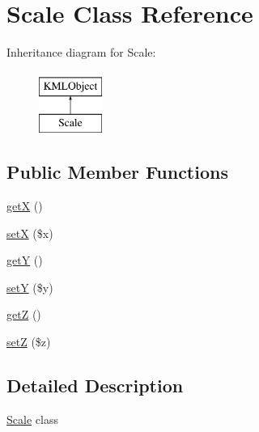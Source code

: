 \hypertarget{classScale}{
\section{Scale Class Reference}
\label{dd/d9a/classScale}
}
Inheritance diagram for Scale:\begin{figure}[H]
\begin{center}
\leavevmode
\includegraphics[height=2.000000cm]{dd/d9a/classScale}
\end{center}
\end{figure}
\subsection*{Public Member Functions}
\begin{DoxyCompactItemize}
\item 
\hyperlink{classScale_ad9463271df7904a553d87c057d715a2b}{getX} ()
\item 
\hyperlink{classScale_a2df161b4605576c9728685b31b94fc39}{setX} (\$x)
\item 
\hyperlink{classScale_a067e898a2439dd1ac838b99d76dc8820}{getY} ()
\item 
\hyperlink{classScale_a370b79874cccd764b351dee7c4fdb8d1}{setY} (\$y)
\item 
\hyperlink{classScale_a04c3de32fe999c61a49e6bf8ad62235f}{getZ} ()
\item 
\hyperlink{classScale_aeba7ec21e7c0d16090ec26f7a47d2c87}{setZ} (\$z)
\end{DoxyCompactItemize}


\subsection{Detailed Description}
\hyperlink{classScale}{Scale} class 

